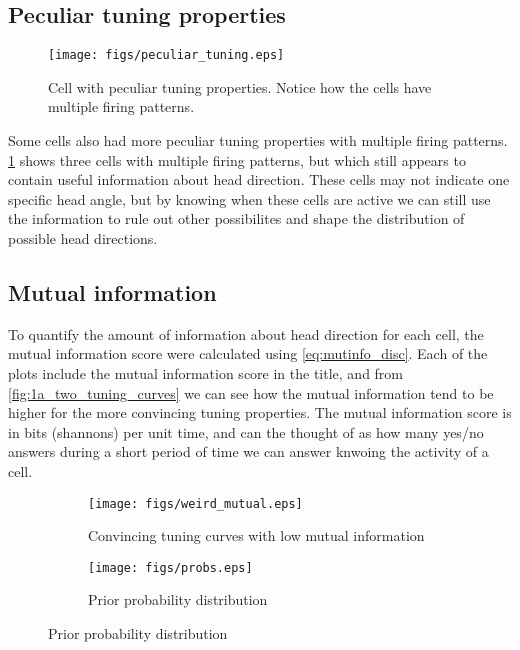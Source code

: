 \subsection{Peculiar tuning properties}
\begin{figure}[H]
    \centering
    \texttt{[image: figs/peculiar\_tuning.eps]}
    \caption{Cell with peculiar tuning properties. Notice how the cells have multiple firing patterns.}
    \label{fig:peculiar_tuning}
\end{figure}
Some cells also had more peculiar tuning properties with multiple firing patterns. \cref{fig:peculiar_tuning} shows three cells with multiple firing patterns, but which still appears to contain useful information about head direction. These cells may not indicate one specific head angle, but by knowing when these cells are active we can still use the information to rule out other possibilites and shape the distribution of possible head directions.

\subsection{Mutual information}
To quantify the amount of information about head direction for each cell, the mutual information score were calculated using \cref{eq:mutinfo_disc}. Each of the plots include the mutual information score in the title, and from \cref{fig:1a_two_tuning_curves} we can see how the mutual information tend to be higher for the more convincing tuning properties. The mutual information score is in bits (shannons) per unit time, and can the thought of as how many yes/no answers during a short period of time we can answer knwoing the activity of a cell.

\begin{figure}[H]
    \centering
    \begin{subfigure}[b]{0.49\textwidth}
        \texttt{[image: figs/weird\_mutual.eps]}
        \caption{Convincing tuning curves with low mutual information}
        \label{fig:weird_mutual}
    \end{subfigure}
    \begin{subfigure}[b]{0.49\textwidth}
        \texttt{[image: figs/probs.eps]}
        \caption{Prior probability distribution}
        \label{fig:probs}
    \end{subfigure}
\end{figure}

